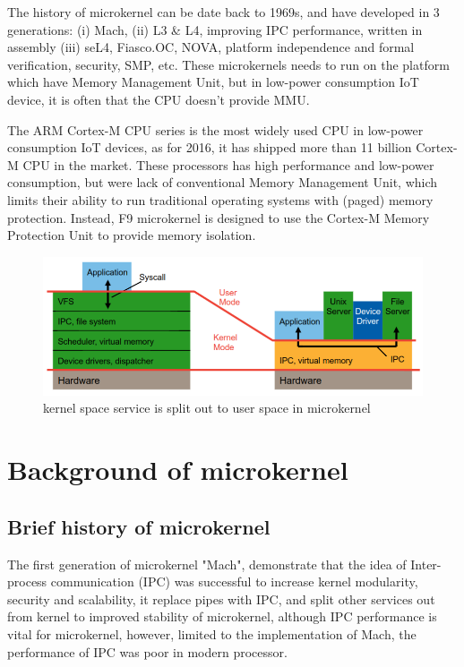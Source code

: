 \documentclass[10pt,preprint,nocopyrightspace]{sigplanconf}
\begin{document}
The history of microkernel can be date back to 1969s, and have developed in 3 generations: (i) Mach, (ii) L3 \& L4, improving IPC performance, written in assembly (iii) seL4, Fiasco.OC, NOVA, platform independence and formal verification, security, SMP, etc. These microkernels needs to run on the platform which have Memory Management Unit, but in low-power consumption IoT device, it is often that the CPU doesn't provide MMU.

The ARM Cortex-M CPU series is the most widely used CPU in low-power consumption IoT devices, as for 2016, it has shipped more than 11 billion Cortex-M CPU in the market. These processors has high performance and low-power consumption, but were lack of conventional Memory Management Unit, which limits their ability to run traditional operating systems with (paged) memory protection. Instead, F9 microkernel is designed to use the Cortex-M Memory Protection Unit to provide memory isolation. 

\begin{figure}[H]
	\begin{center}
		\includegraphics[width=\linewidth]{picture/kernel_diff.png}
	\end{center}
	\caption{kernel space service is split out to user space in microkernel \cite{heiser2012}}
	\label{fig:kernel_diff}
\end{figure}


\section{Background of microkernel}

\subsection{Brief history of microkernel}

The first generation of microkernel "Mach", demonstrate that the idea of Inter-process communication (IPC) was successful to increase kernel modularity, security and scalability, it replace pipes with IPC, and split other services out from kernel to improved stability of microkernel, although IPC performance is vital for microkernel, however, limited to the implementation of Mach, the performance of IPC was poor in modern processor\cite{liedtke1993improving}.
\end{document}
